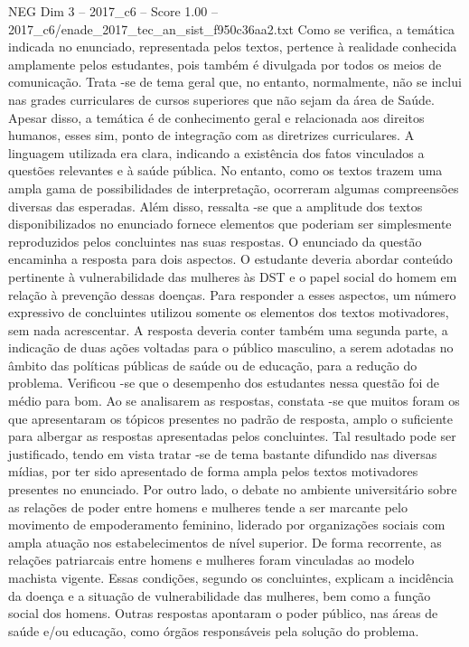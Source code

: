 \begin{textsample}{NEG Dim 3 – 2017\_c6 – Score 1.00 – 2017\_c6/enade\_2017\_tec\_an\_sist\_f950c36aa2.txt}
Como se verifica, a temática indicada no enunciado, representada pelos textos, pertence à realidade conhecida amplamente pelos estudantes, pois também é divulgada por todos os meios de comunicação.
Trata -se de tema geral que, no entanto, normalmente, não se inclui nas grades curriculares de cursos superiores que não sejam da área de Saúde.
Apesar disso, a temática é de conhecimento geral e relacionada aos direitos humanos, esses sim, ponto de integração com as diretrizes curriculares.
A linguagem utilizada era clara, indicando a existência dos fatos vinculados a questões relevantes e à saúde pública.
No entanto, como os textos trazem uma ampla gama de possibilidades de interpretação, ocorreram algumas compreensões diversas das esperadas.
Além disso, ressalta -se que a amplitude dos textos disponibilizados no enunciado fornece elementos que poderiam ser simplesmente reproduzidos pelos concluintes nas suas respostas.
O enunciado da questão encaminha a resposta para dois aspectos.
O estudante deveria abordar conteúdo pertinente à vulnerabilidade das mulheres às DST e o papel social do homem em relação à prevenção dessas doenças.
Para responder a esses aspectos, um número expressivo de concluintes utilizou somente os elementos dos textos motivadores, sem nada acrescentar.
A resposta deveria conter também uma segunda parte, a indicação de duas ações voltadas para o público masculino, a serem adotadas no âmbito das políticas públicas de saúde ou de educação, para a redução do problema.
Verificou -se que o desempenho dos estudantes nessa questão foi de médio para bom.
Ao se analisarem as respostas, constata -se que muitos foram os que apresentaram os tópicos presentes no padrão de resposta, amplo o suficiente para albergar as respostas apresentadas pelos concluintes.
Tal resultado pode ser justificado, tendo em vista tratar -se de tema bastante difundido nas diversas mídias, por ter sido apresentado de forma ampla pelos textos motivadores presentes no enunciado.
Por outro lado, o debate no ambiente universitário sobre as relações de poder entre homens e mulheres tende a ser marcante pelo movimento de empoderamento feminino, liderado por organizações sociais com ampla atuação nos estabelecimentos de nível superior.
De forma recorrente, as relações patriarcais entre homens e mulheres foram vinculadas ao modelo machista vigente.
Essas condições, segundo os concluintes, explicam a incidência da doença e a situação de vulnerabilidade das mulheres, bem como a função social dos homens.
Outras respostas apontaram o poder público, nas áreas de saúde e/ou educação, como órgãos responsáveis pela solução do problema.

\end{textsample}
